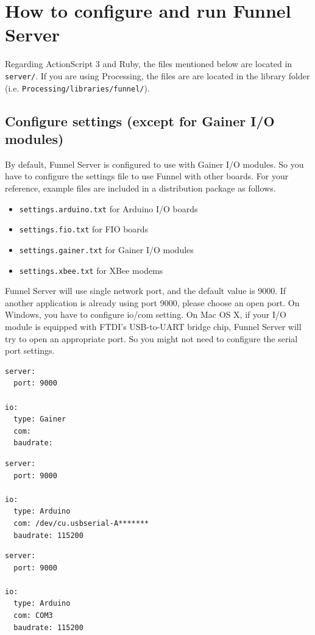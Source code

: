 \documentclass[9pt]{jsarticle}
\begin{document}
\clearpage
\section{How to configure and run Funnel Server}
Regarding ActionScript 3 and Ruby, the files mentioned below are located in \texttt{server/}. If you are using Processing, the files are are located in the library folder (i.e. \texttt{Processing/libraries/funnel/}). 

\subsection{Configure settings (except for Gainer I/O modules)}
By default, Funnel Server is configured to use with Gainer I/O modules. So you have to configure the settings file to use Funnel with other boards. For your reference, example files are included in a distribution package as follows.
\begin{itemize}
\item \texttt{settings.arduino.txt} for Arduino I/O boards
\item \texttt{settings.fio.txt} for FIO boards
\item \texttt{settings.gainer.txt} for Gainer I/O modules
\item \texttt{settings.xbee.txt} for XBee modems
\end{itemize}
Funnel Server will use single network port, and the default value is 9000. If another application is already using port 9000, please choose an open port. On Windows, you have to configure io/com setting. On Mac OS X, if your I/O module is equipped with FTDI's USB-to-UART bridge chip, Funnel Server will try to open an appropriate port. So you might not need to configure the serial port settings.

\begin{lstlisting}[caption={An example of settings.txt for Gainer I/O modules},label=useless]
server:
  port: 9000

io:
  type: Gainer
  com: 
  baudrate: 
\end{lstlisting}

\begin{lstlisting}[caption={An example of settings.txt for Arduino I/O boards (Mac OS X)},label=useless]
server:
  port: 9000

io:
  type: Arduino
  com: /dev/cu.usbserial-A*******
  baudrate: 115200
\end{lstlisting}

\begin{lstlisting}[caption={An example of settings.txt for Arduino I/O boards (Windows)},label=useless]
server:
  port: 9000

io:
  type: Arduino
  com: COM3
  baudrate: 115200
\end{lstlisting}
\end{document}

